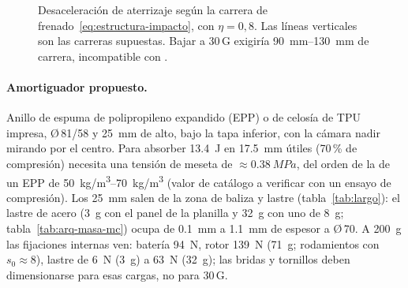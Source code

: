 \begin{figure}[H]
\centering
{}
\caption{Desaceleración de aterrizaje según la carrera de frenado~\eqref{eq:estructura-impacto},
con $\eta=0{,}8$. Las líneas verticales son las carreras supuestas. Bajar a 30\,G exigiría
\SIrange{90}{130}{mm} de carrera, incompatible con .}
\label{fig:estructura-impacto}
\end{figure}

\paragraph{Amortiguador propuesto.} Anillo de espuma de polipropileno expandido (EPP) o
de celosía de TPU impresa, Ø\,81/58 y \SI{25}{mm} de alto, bajo la tapa inferior, con la
cámara nadir mirando por el centro. Para absorber \SI{13.4}{J} en \SI{17.5}{mm} útiles
(70\,\% de compresión) necesita una tensión de meseta de $\approx\SI{0.38}{MPa}$, del orden
de la de un EPP de \SIrange{50}{70}{kg/m^3} (valor de catálogo a verificar con un ensayo
de compresión). Los \SI{25}{mm} salen de la zona de baliza y lastre
(tabla~\ref{tab:largo}): el lastre de acero (\SI{3}{g} con el panel de la planilla y \SI{32}{g} con uno
de \SI{8}{g}; tabla~\ref{tab:arq-masa-mc}) ocupa de \SI{0.1}{mm} a \SI{1.1}{mm} de
espesor a Ø\,70. A \SI{200}{g} las fijaciones internas ven: batería \SI{94}{N}, rotor
\SI{139}{N} (\SI{71}{g}; rodamientos con $s_0\approx8$), lastre de \SI{6}{N} (\SI{3}{g}) a \SI{63}{N} (\SI{32}{g}); las bridas y tornillos
deben dimensionarse para esas cargas, no para 30\,G.

